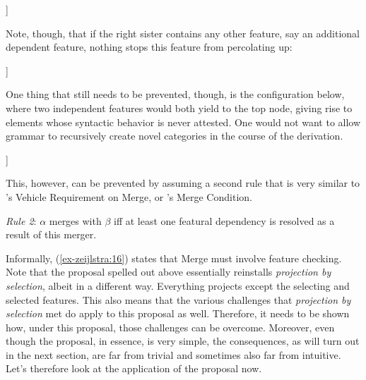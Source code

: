 \documentclass[output=paper
,modfonts
,nonflat]{langsci/langscibook}
\begin{document}
	\begin{exe}
		\ex\label{ex-zeijlstra:13}
		\begin{forest}	
			[\{{[}F{]}\}
			[\{{[}F{]}{,} {[}uG{]}\}]
			[\{{[}G{]}\}] ]
		\end{forest}
	\end{exe}
\noindent Note, though, that if the right sister contains any other feature, say an additional dependent feature, nothing stops this feature from percolating up:\largerpage

	\begin{exe}\ex
		\begin{forest}	
			[\{{[}F{]}{,} {[}uK{]}\}
			[\{{[}F{]}{,} {[}uG{]}\}]
			[\{{[}G{]}{,} {[}uK{]}\}] ]
		\end{forest}
	\end{exe}
\newpage\noindent One thing that still needs to be prevented, though, is the configuration below, where two independent features would both yield to the top node, giving rise to elements whose syntactic behavior is never attested. One would not want to allow grammar to recursively create novel categories in the course of the derivation.

	\begin{exe}
		\ex
		\begin{forest}	
			[*\{{[}F{]}{,} {[}G{]}\}
			[\{{[}F{]}\}]
			[\{{[}G{]}\}] ]
		\end{forest}
	\end{exe}
\noindent This, however, can be prevented by assuming a second rule that is very similar to \citet{Pesetsky_Torrego2006}'s Vehicle Requirement on Merge, or \citet{Wurmbrand2014}'s Merge Condition.

\begin{exe}
\ex \label{ex-zeijlstra:16} \textit{Rule 2}: $\alpha$ merges with $\beta$ iff at least one featural dependency is resolved as a result of this merger.
\end{exe}
Informally, (\ref{ex-zeijlstra:16}) states that Merge must involve feature checking. Note that the proposal spelled out above essentially reinstalls \textit{projection by selection}, albeit in a different way. Everything projects except the selecting and selected features. This also means that the various challenges that \textit{projection by selection} met do apply to this proposal as well. Therefore, it needs to be shown how, under this proposal, those challenges can be overcome. Moreover, even though the proposal, in essence, is very simple, the consequences, as will turn out in the next section, are far from trivial and sometimes also far from intuitive. Let’s therefore look at the application of the proposal now.
\end{document}
